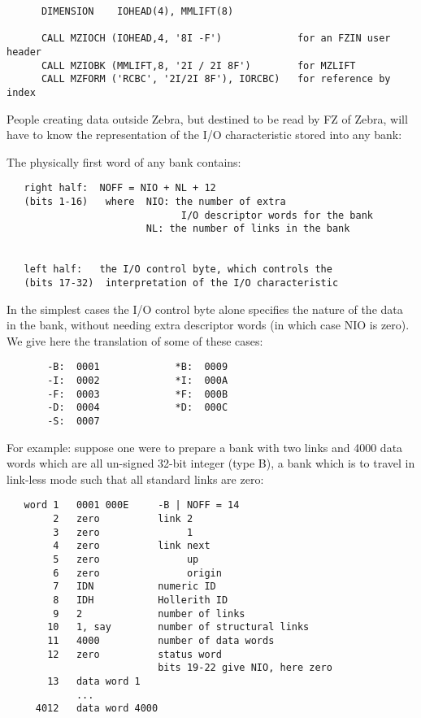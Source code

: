 \Examples

\begin{verbatim}
      DIMENSION    IOHEAD(4), MMLIFT(8)

      CALL MZIOCH (IOHEAD,4, '8I -F')             for an FZIN user header
      CALL MZIOBK (MMLIFT,8, '2I / 2I 8F')        for MZLIFT
      CALL MZFORM ('RCBC', '2I/2I 8F'), IORCBC)   for reference by index
\end{verbatim} 

People creating data outside Zebra,
but destined to be read by FZ of Zebra,
will have to know the representation of the I/O characteristic
stored into any bank:

The physically first word of any bank contains:

\begin{verbatim}
   right half:  NOFF = NIO + NL + 12
   (bits 1-16)   where  NIO: the number of extra
                              I/O descriptor words for the bank
                        NL: the number of links in the bank


   left half:   the I/O control byte, which controls the
   (bits 17-32)  interpretation of the I/O characteristic
\end{verbatim} 

In the simplest cases the I/O control byte alone specifies
the nature of the data in the bank, without needing extra
descriptor words (in which case NIO is zero).
We give here the translation of some of these cases:

\begin{verbatim}
       -B:  0001             *B:  0009
       -I:  0002             *I:  000A
       -F:  0003             *F:  000B
       -D:  0004             *D:  000C
       -S:  0007
\end{verbatim} 

For example: suppose one were to prepare a bank with
two links and 4000 data words which are all un-signed
32-bit integer (type B), a bank which is to travel
in link-less mode such that all standard links are zero:

\begin{verbatim}
   word 1   0001 000E     -B | NOFF = 14
        2   zero          link 2
        3   zero               1
        4   zero          link next
        5   zero               up
        6   zero               origin
        7   IDN           numeric ID
        8   IDH           Hollerith ID
        9   2             number of links
       10   1, say        number of structural links
       11   4000          number of data words
       12   zero          status word
                          bits 19-22 give NIO, here zero
       13   data word 1
            ...
     4012   data word 4000
\end{verbatim} 

